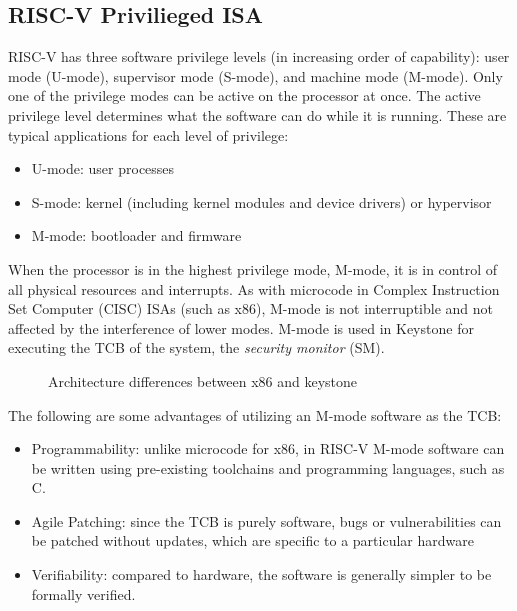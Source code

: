\subsection{RISC-V Privilieged ISA}
RISC-V \cite{risc-v-spec} has three software privilege levels (in increasing order of capability): user mode (U-mode), supervisor mode (S-mode), and machine mode (M-mode). Only one of the privilege modes can be active on the processor at once.
The active privilege level determines what the software can do while it is running. These are typical applications for each level of privilege:
\begin{itemize}
    \item U-mode: user processes 
    \item S-mode: kernel (including kernel modules and device drivers) or hypervisor
    \item M-mode: bootloader and firmware
\end{itemize}
When the processor is in the highest privilege mode, M-mode, it is in control of all physical resources and interrupts. As with microcode in Complex Instruction Set Computer (CISC) ISAs (such as x86), M-mode is not interruptible and not affected by the interference of lower modes. M-mode is used in Keystone for executing the TCB of the system, the \textit{security monitor} (SM).
\begin{figure}[h!]
    \centering
    
    \caption{Architecture differences between x86 and keystone}
    \label{keystone-vs-x86}
\end{figure}
The following are some advantages of utilizing an M-mode software as the TCB:
\begin{itemize}
    \item Programmability: unlike microcode for x86, in RISC-V M-mode software can be written using pre-existing toolchains and programming languages, such as C. 
    \item Agile Patching: since the TCB is purely software, bugs or vulnerabilities can be patched without updates, which are specific to a particular hardware 
    \item Verifiability: compared to hardware, the software is generally simpler to be formally verified.
\end{itemize}

